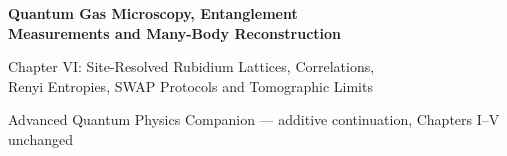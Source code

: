 \documentclass[11pt,a4paper]{article}
\begin{document}
\begin{center}
{\Large\bfseries\color{deepblue} Quantum Gas Microscopy, Entanglement\\ Measurements and Many-Body Reconstruction}\par\medskip
{\large Chapter VI: Site-Resolved Rubidium Lattices, Correlations,\\ Renyi Entropies, SWAP Protocols and Tomographic Limits}\par\smallskip
{\small Advanced Quantum Physics Companion --- additive continuation, Chapters I--V unchanged}\par
\end{center}
\begin{abstract}
We develop the experimental and mathematical logic that connects fluorescence images of atoms in optical lattices to many-body observables. The distinction between a measured number configuration and a quantum wavefunction is maintained throughout. We derive density correlations, the static structure factor, parity-projection effects, site-resolved coherence, reduced density matrices, second Renyi entropy via two-copy SWAP measurements, and limits of partial tomography. Twelve worked examples, original diagrams and explicit experimental qualifications are included. Unless otherwise stated, orbitals here are \emph{motional modes of complete Rb-87 atoms}, not electronic $5s$ orbitals.
\end{abstract}
\tableofcontents\clearpage
\end{document}
